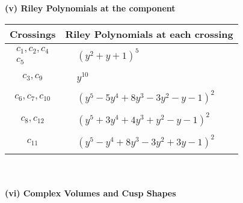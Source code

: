 \documentclass[1p]{elsarticle_modified}
\theoremstyle{definition}
\begin{document}
\newpage\renewcommand{\arraystretch}{1}
\flushleft \textbf{(v) Riley Polynomials at the component}\newline \\
\begin{tabular}{m{50pt}|m{274pt}}
Crossings & \hspace{64pt}Riley Polynomials at each crossing \\
\hline $$\begin{aligned}c_{1},c_{2},c_{4}\\c_{5}\end{aligned}$$&$\begin{aligned}
&(y^2+y+1)^5
\end{aligned}$\\
\hline $$\begin{aligned}c_{3},c_{9}\end{aligned}$$&$\begin{aligned}
&y^{10}
\end{aligned}$\\
\hline $$\begin{aligned}c_{6},c_{7},c_{10}\end{aligned}$$&$\begin{aligned}
&(y^5-5 y^4+8 y^3-3 y^2- y-1)^2
\end{aligned}$\\
\hline $$\begin{aligned}c_{8},c_{12}\end{aligned}$$&$\begin{aligned}
&(y^5+3 y^4+4 y^3+y^2- y-1)^2
\end{aligned}$\\
\hline $$\begin{aligned}c_{11}\end{aligned}$$&$\begin{aligned}
&(y^5- y^4+8 y^3-3 y^2+3 y-1)^2
\end{aligned}$\\
\hline
\end{tabular}\\~\\
\newpage\flushleft \textbf{(vi) Complex Volumes and Cusp Shapes}
\end{document}
